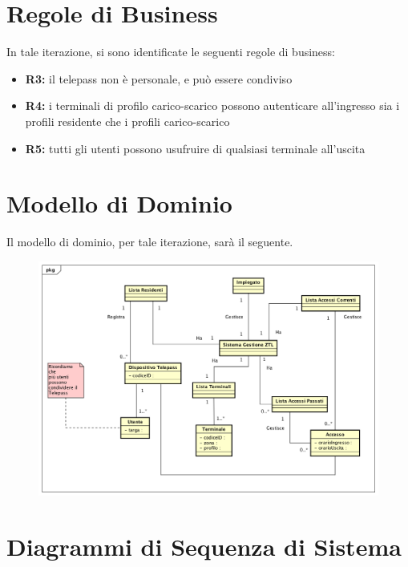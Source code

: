 \documentclass[12pt, letterpaper]{article}
\begin{document}
\section{Regole di Business}
In tale iterazione, si sono identificate 
le seguenti regole di business:
\begin{itemize}
    \item \textbf{R3:} il telepass non è personale, 
    e può essere condiviso
    \item \textbf{R4:} i terminali di profilo 
    carico-scarico possono autenticare all'ingresso 
    sia i profili residente che i profili carico-scarico 
    \item \textbf{R5:} tutti gli utenti possono usufruire 
    di qualsiasi terminale all'uscita 
\end{itemize}

\section{Modello di Dominio}
Il modello di dominio, per tale iterazione,
sarà il seguente.
\begin{figure}[H]
    \centering
    \includegraphics[scale=0.40]{ModelloDominio}
    \label{fig:mesh1}
\end{figure}

\section{Diagrammi di Sequenza di Sistema}
\end{document}

